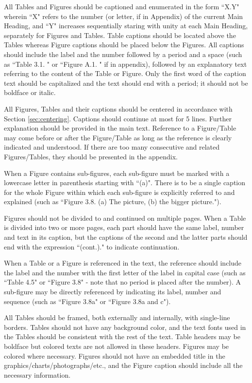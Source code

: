 \documentclass[a4paper,oneside,12pt]{report}
\numberwithin{equation}{chapter}
\begin{document}
All Tables and Figures should be captioned and enumerated in the form ``X.Y" wherein ``X" refers to the number (or letter, if in Appendix) of the current Main Heading, and ``Y" increases sequentially staring with unity at each Main Heading, separately for Figures and Tables. Table captions should be located above the Tables whereas Figure captions should be placed below the Figures.  All captions should include the label and the number followed by a period and a space (such as ``Table 3.1. " or ``Figure A.1. " if in appendix), followed by an explanatory text referring to the content of the Table or Figure. Only the first word of the caption text should be capitalized and the text should end with a period; it should not be boldface or italic.

All Figures, Tables and their captions should be centered in accordance with Section \ref{sec:centering}. Captions should continue at most for 5 lines. Further explanation should be provided in the main text. Reference to a Figure/Table may come before or after the Figure/Table as long as the reference is clearly indicated and understood. If there are too many consecutive and related Figures/Tables, they should be presented in the appendix.

When a Figure contains sub-figures, each sub-figure must be marked with a lowercase letter in parenthesis starting with ``(a)". There is to be a single caption for the whole Figure within which each sub-figure is explicitly referred to and explained (such as ``Figure 3.8. (a) The picture, (b) the bigger picture.").

Figures should not be divided to and continued on multiple pages. When a Table is divided into two or more pages, each part should have the same label, number and text in its caption, but the captions of the second and the latter parts should end with the expression ``(cont.)." to indicate continuation.

When a Table or a Figure is referenced in the text, the reference should include the label and the number with the first letter of the label in capital case (such as
``Table 4.5" or ``Figure 3.8" - note that no period is placed after the number). A sub-figure may be directly referenced by indicating its label, number and sequence (such as ``Figure 3.8a" or ``Figure 3.8a and c").

All Tables should be framed, both externally and internally, with single-line borders. Tables should not have any background color, and the text fonts used in the Tables should
be consistent with the rest of the text. Table headers may be boldface
but colored texts are not allowed in these headers. Figures may be
colored where necessary. Figures should not have an embedded title in
the graphics/charts/photographs/etc., and the Figure caption should include all the necessary information.
\end{document}
